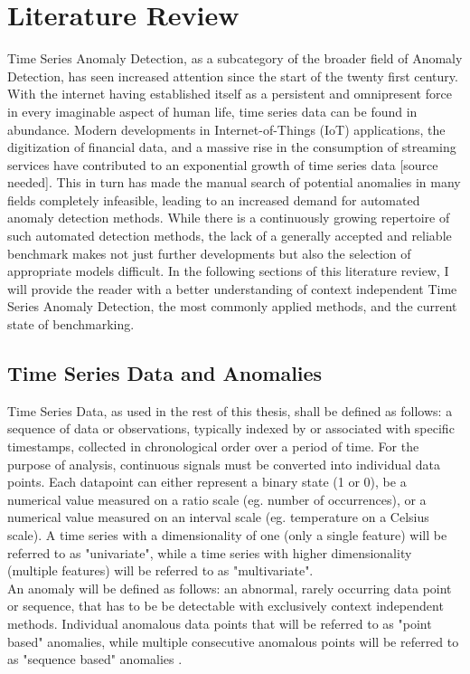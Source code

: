 \documentclass[12pt,oneside]{article}
\begin{document}
\section{Literature Review} \label{einleitung}
Time Series Anomaly Detection, as a subcategory of the broader field of Anomaly Detection, has seen increased attention since the start of the twenty first century. With the internet having established itself as a persistent and omnipresent force in every imaginable aspect of human life, time series data can be found in abundance. Modern developments in Internet-of-Things (IoT) applications, the digitization of financial data, and a massive rise in the consumption of streaming services have contributed to an exponential growth of time series data [source needed]. This in turn has made the manual search of potential anomalies in many fields completely infeasible, leading to an increased demand for automated anomaly detection methods. While there is a continuously growing repertoire of such automated detection methods, the lack of a generally accepted and reliable benchmark makes not just further developments but also the selection of appropriate models difficult. In the following sections of this literature review, I will provide the reader with a better understanding of context independent Time Series Anomaly Detection, the most commonly applied methods, and the current state of benchmarking.


\subsection{Time Series Data and Anomalies}
Time Series Data, as used in the rest of this thesis, shall be defined as follows: a sequence of data or observations, typically indexed by or associated with specific timestamps, collected in chronological order over a period of time.
For the purpose of analysis, continuous signals must be converted into individual data points. Each datapoint can either represent a binary state (1 or 0), be a numerical value measured on a ratio scale (eg. number of occurrences), or a numerical value measured on an interval scale (eg. temperature on a Celsius scale).
A time series with a dimensionality of one (only a single feature) will be referred to as "univariate", while a time series with higher dimensionality (multiple features) will be referred to as "multivariate". \\
An anomaly will be defined as follows: an abnormal, rarely occurring data point or sequence, that has to be be detectable with exclusively context independent methods. Individual anomalous data points that will be referred to as "point based" anomalies, while multiple consecutive anomalous points will be referred to as "sequence based" anomalies \citep[S. 3]{liu2024elephant}.
\end{document}
